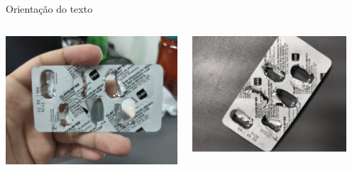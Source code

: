 \begin{frame}{Orientação do texto}
	\centering
	\begin{columns}
		\begin{column}{0.5\textwidth}
			\centering
			\includegraphics[width=\textwidth]{../pictures/IMG_20240229_162005.jpg}
		\end{column}
		\begin{column}{0.5\textwidth}
			\centering
			\includegraphics[width=0.9\textwidth, angle=-90]{../pictures/IMG_20240307_185809.jpg}
		\end{column}
	\end{columns}
\end{frame}

